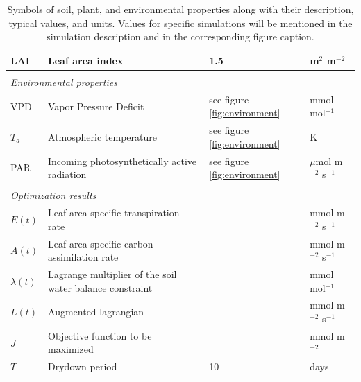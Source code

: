 \documentclass[utf8]{frontiersSCNS} %
\begin{document}
\begin{table}[h]
\begin{tabular}{l l l l}
        LAI & Leaf area index & 1.5 & m$^{2}$ m$^{-2}$\\
        \hline
        \multicolumn{4}{l}{}\\
        \multicolumn{4}{l}{\textit{Environmental properties}}\\
        \hline
        VPD & Vapor Pressure Deficit & see figure \ref{fig:environment} & mmol mol$^{-1}$\\
        $T_a$ & Atmospheric temperature & see figure \ref{fig:environment} & K \\
        PAR & Incoming photosynthetically active radiation & see figure \ref{fig:environment} & $\mu$mol m$^{-2}$ s$^{-1}$ \\
        \hline
        \multicolumn{4}{l}{}\\
        \multicolumn{4}{l}{\textit{Optimization results}}\\
        \hline
        $E(t)$ & Leaf area specific transpiration rate & & mmol m$^{-2}$ s$^{-1}$\\
        $A(t)$ & Leaf area specific carbon assimilation rate & & mmol m$^{-2}$ s$^{-1}$\\
        $\lambda (t)$ & Lagrange multiplier of the soil water balance constraint & & mmol mol$^{-1}$\\
        $L(t)$ & Augmented lagrangian & & mmol m$^{-2}$ s$^{-1}$\\
        $J$ & Objective function to be maximized & & mmol m$^{-2}$\\
        $T$ & Drydown period & 10 & days\\
    \end{tabular}
    \caption{Symbols of soil, plant, and environmental properties along with their description, typical values, and units. Values for specific simulations will be mentioned in the simulation description and in the corresponding figure caption.}
    \label{tab:props}
\end{table}



\end{document}
